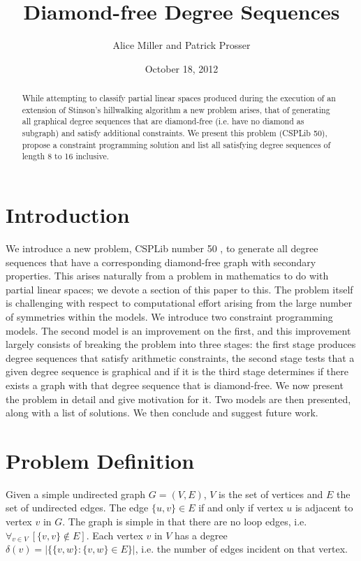 \documentclass{l4proj}
\begin{document}
\title{Diamond-free Degree Sequences}
\author{Alice Miller and Patrick Prosser}
\date{October 18, 2012}
\maketitle

\begin{abstract}
While attempting to classify partial linear spaces produced during the execution of an
extension of Stinson's hillwalking algorithm a new problem arises, that of generating all graphical degree sequences 
that are diamond-free (i.e. have no diamond as subgraph) and satisfy additional constraints.  
We present this problem (CSPLib 50), propose a constraint programming solution and list all
satisfying degree sequences of length 8 to 16 inclusive.
\end{abstract}

\educationalconsent
%
%
\tableofcontents

\chapter{Introduction}
\label{sec:intro}
\vspace{-3mm}
We introduce a new problem, CSPLib number 50 \cite{CSPLib}, to generate all degree sequences that have a
corresponding diamond-free graph with secondary properties. This
arises naturally from a problem in mathematics to do with partial linear spaces; 
we devote a section of this paper to this. The problem itself is challenging with respect to 
computational effort arising from the large number of symmetries within the models. We introduce
two constraint programming models. The second model is an improvement on the first, and this improvement
largely consists of breaking the problem into three stages: the first stage produces degree sequences 
that satisfy arithmetic constraints, the second stage tests that a given degree sequence is graphical and if it is the third stage determines if
there exists a graph with that degree sequence that is diamond-free. We now present the problem in detail and
give motivation for it. Two models are then presented, along with a list of solutions. We then conclude and
suggest future work.

\chapter{Problem Definition}
\label{sec:probDefn}
\vspace{-3mm}
Given a simple undirected graph $G = (V,E)$, $V$ is the set of vertices and $E$ the set of undirected 
edges. The edge $\{u,v\} \in E$ if and only if vertex $u$ is adjacent to vertex $v$ in $G$. 
The graph is simple in that there are no loop edges, 
i.e. $\forall_{v \in V}~[\{v,v\} \notin E]$. Each vertex $v$ in $V$ has a degree 
$\delta(v) = |\{\{v,w\} : \{v,w\} \in E\}|$, i.e. the number of edges incident on that vertex.
\end{document}
